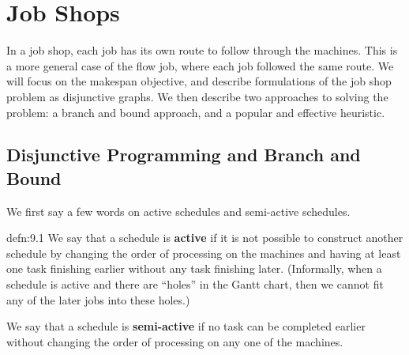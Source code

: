 \section{Job Shops} \label{sec:9}
In a job shop, each job has its own route to follow through the machines. 
This is a more general case of the flow job, where each job followed 
the same route. We will focus on the makespan objective, and describe 
formulations of the job shop problem as disjunctive graphs. We then 
describe two approaches to solving the problem: a branch and bound approach, 
and a popular and effective heuristic. 

\subsection{Disjunctive Programming and Branch and Bound} \label{subsec:9.1}
We first say a few words on active schedules and semi-active schedules.

\begin{defn}{defn:9.1}
    We say that a schedule is {\bf active} if it is not possible to 
    construct another schedule by changing the order of processing on the 
    machines and having at least one task finishing earlier without 
    any task finishing later. (Informally, when a schedule is active and there 
    are ``holes'' in the Gantt chart, then we cannot fit any of the later jobs 
    into these holes.)

    We say that a schedule is {\bf semi-active} if no task can be 
    completed earlier without changing the order of processing on any 
    one of the machines. 
\end{defn}

